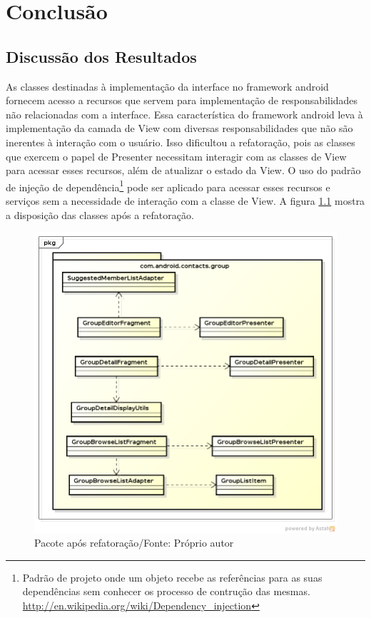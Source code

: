 \chapter{Conclusão} 

\section{Discussão dos Resultados} 

As classes destinadas à implementação da interface no framework android fornecem
acesso a recursos que servem para implementação de responsabilidades não
relacionadas com a interface. Essa característica do framework android leva à
implementação da camada de View com diversas responsabilidades que não são
inerentes à interação com o usuário. Isso dificultou a refatoração, pois as
classes que exercem o papel de Presenter necessitam interagir com as classes de
View para acessar esses recursos, além de atualizar o estado da View. O uso do
padrão de injeção de
dependência\footnote{Padrão
de projeto onde um objeto recebe as referências para as suas dependências sem
conhecer os processo de contrução das mesmas.
\url{http://en.wikipedia.org/wiki/Dependency_injection}}
pode ser aplicado para acessar esses recursos e serviços sem a necessidade de
interação com a classe de View. A figura \ref{fig:classes_iteracao3} mostra a
disposição das classes após a refatoração.


\begin{figure}[!h]
	\centering
	\label{fig:classes_iteracao3}
	\includegraphics[scale=0.55]{img/classes_iteracao3}
	\caption{Pacote após refatoração/Fonte: Próprio autor}
\end{figure}


